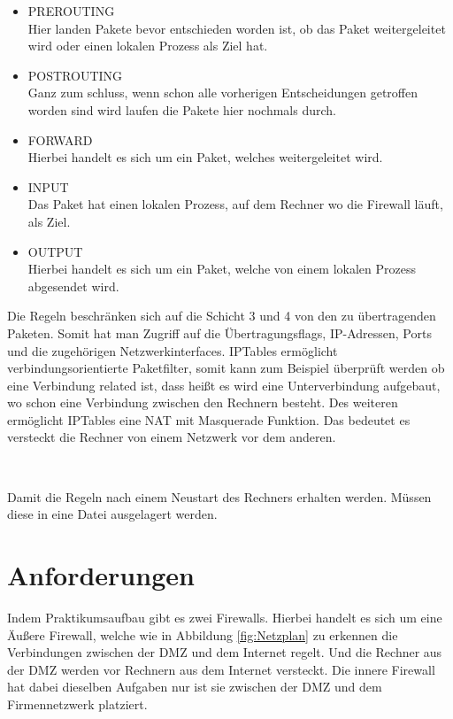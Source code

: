 \begin{itemize}
	\item PREROUTING \\
	Hier landen Pakete bevor entschieden worden ist, ob das Paket weitergeleitet wird oder einen lokalen Prozess als Ziel hat.
	\item POSTROUTING \\
	Ganz zum schluss, wenn schon alle vorherigen Entscheidungen getroffen worden sind wird laufen die Pakete hier nochmals durch.
	\item FORWARD \\
	Hierbei handelt es sich um ein Paket, welches weitergeleitet wird.
	\item INPUT \\
	Das Paket hat einen lokalen Prozess, auf dem Rechner wo die Firewall läuft, als Ziel.
	\item OUTPUT \\
	Hierbei handelt es sich um ein Paket, welche von einem lokalen Prozess abgesendet wird.
\end{itemize}
Die Regeln beschränken sich auf die Schicht 3 und 4 von den zu übertragenden Paketen. Somit hat man Zugriff auf die Übertragungsflags, IP-Adressen, Ports und die zugehörigen Netzwerkinterfaces. IPTables ermöglicht verbindungsorientierte Paketfilter, somit kann zum Beispiel überprüft werden ob eine Verbindung related ist, dass heißt es wird eine Unterverbindung aufgebaut, wo schon eine Verbindung zwischen den Rechnern besteht. Des weiteren ermöglicht IPTables eine NAT mit Masquerade Funktion. Das bedeutet es versteckt die Rechner von einem Netzwerk vor dem anderen.

\

 Damit die Regeln nach einem Neustart des Rechners erhalten werden. Müssen diese in eine Datei ausgelagert werden.


\section{Anforderungen}
Indem Praktikumsaufbau gibt es zwei Firewalls. Hierbei handelt es sich um eine Äußere Firewall, welche wie in Abbildung \ref{fig:Netzplan} zu erkennen die Verbindungen zwischen der DMZ und dem Internet regelt. Und die Rechner aus der DMZ werden vor Rechnern aus dem Internet versteckt. Die innere Firewall hat dabei dieselben Aufgaben nur ist sie zwischen der DMZ und dem Firmennetzwerk platziert.

